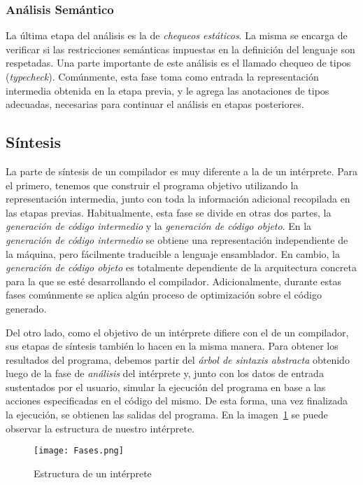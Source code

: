 \subsubsection{Análisis Semántico}

La última etapa del análisis es la de \textit{chequeos estáticos}.
La misma se encarga de verificar si las restricciones semánticas impuestas en la definición del lenguaje son respetadas.
Una parte importante de este análisis es el llamado chequeo de tipos (\textit{typecheck}).
Comúnmente, esta fase toma como entrada la representación intermedia obtenida en la etapa previa, y le agrega las anotaciones de tipos adecuadas, necesarias para continuar el análisis en etapas posteriores.

\subsection{Síntesis}

La parte de síntesis de un compilador es muy diferente a la de un intérprete.
Para el primero, tenemos que construir el programa objetivo utilizando la representación intermedia, junto con toda la información adicional recopilada en las etapas previas.
Habitualmente, esta fase se divide en otras dos partes, la \textit{generación de código intermedio} y la \textit{generación de código objeto}.
En la \textit{generación de código intermedio} se obtiene una representación independiente de la máquina, pero fácilmente traducible a lenguaje ensamblador.
En cambio, la \textit{generación de código objeto} es totalmente dependiente de la arquitectura concreta para la que se esté desarrollando el compilador.
Adicionalmente, durante estas fases comúnmente se aplica algún proceso de optimización sobre el código generado.

Del otro lado, como el objetivo de un intérprete difiere con el de un compilador, sus etapas de síntesis también lo hacen en la misma manera.
Para obtener los resultados del programa, debemos partir del \textit{árbol de sintaxis abstracta} obtenido luego de la fase de \textit{análisis} del intérprete y, junto con los datos de entrada sustentados por el usuario, simular la ejecución del programa en base a las acciones especificadas en el código del mismo.
De esta forma, una vez finalizada la ejecución, se obtienen las salidas del programa.
En la imagen~\ref{Fases} se puede observar la estructura de nuestro intérprete.

\begin{figure}[h]
\centering
\texttt{[image: Fases.png]}
\caption{Estructura de un intérprete}
\label{Fases}
\end{figure}
\fi

